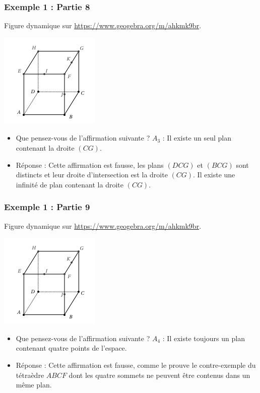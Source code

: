 \documentclass[xcolor=svgnames,t,final]{beamer}
\begin{document}
\begin{frame}

\frametitle{Exemple 1 : Partie 8}

Figure dynamique sur \href{https://www.geogebra.org/m/ahkmk9br}{https://www.geogebra.org/m/ahkmk9br}.


\begin{center}
\includegraphics[scale=0.4]{images/exemple1.png}
\end{center}

\begin{itemize}
\pause \item {\color{blue}  Que pensez-vous de l'affirmation suivante ? $A_{3}$ : \og{} Il existe un seul plan contenant la droite $(CG)$. \fg{}}
\pause \item {\color{red} Réponse :  Cette affirmation est fausse, les plans $(DCG)$ et $(BCG)$ sont distincts et leur droite d'intersection est la droite $(CG)$. Il existe une infinité de plan contenant la droite $(CG)$.  
}
\end{itemize}


\end{frame}


\begin{frame}

\frametitle{Exemple 1 : Partie 9}

Figure dynamique sur \href{https://www.geogebra.org/m/ahkmk9br}{https://www.geogebra.org/m/ahkmk9br}.


\begin{center}
\includegraphics[scale=0.4]{images/exemple1.png}
\end{center}

\begin{itemize}
\pause \item {\color{blue}   Que pensez-vous de l'affirmation suivante ? $A_{4}$ : \og{} Il existe toujours un plan contenant quatre points de l'espace. \fg{}}
\pause \item {\color{red} Réponse :  Cette affirmation est fausse, comme le prouve le contre-exemple du tétraèdre $ABCF$ dont les quatre sommets ne peuvent être contenus dans un même plan.  
}
\end{itemize}


\end{frame}
\end{document}
